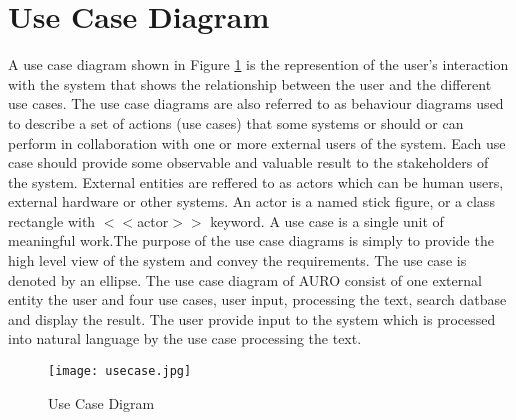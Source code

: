 \section{Use Case Diagram}
A use case diagram shown in Figure \ref{fig:usecase} is the represention  of the user's interaction with the system that shows the relationship between the user and the different use cases. The use case diagrams are also referred to as behaviour diagrams used to describe a set of actions (use cases) that some systems or should or can perform in collaboration with one or more external users of the system. Each use case should provide some observable and valuable result to the stakeholders of the system.
\newline
External entities are reffered to as actors which can be human users, external hardware or other systems. An actor is a named stick figure, or a class rectangle with $<<$actor$>>$  keyword. A use case is a single unit of meaningful work.The purpose of the use case diagrams is simply to provide the high level view of the system and convey the requirements. The use case is denoted by an ellipse.
\newline
The use case diagram of AURO consist of one external entity the user and four use cases, user input, processing the text, search datbase and display the result. The user provide input to the system which is processed into natural language by the use case processing the text.  
\begin{figure}[!h]
  \texttt{[image: usecase.jpg]}
  \caption{Use Case Digram}
  \label{fig:usecase}
\end{figure}


